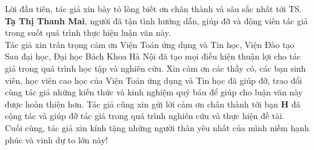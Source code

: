 \documentclass[
12pt, %
oneside, %
english, %
onehalfspacing, %
nolistspacing, %
headsepline, %
addchap,
]{MastersDoctoralThesis} %
\renewcommand{\baselinestretch}{1.5}
\begin{document}

\begin{acknowledgements}

Lời đầu tiên, tác giả xin bày tỏ lòng biết ơn chân thành và sâu sắc nhất tới TS. \textbf{Tạ Thị Thanh Mai}, người đã tận tình hướng dẫn, giúp đỡ và động viên tác giả trong suốt quá trình thực hiện luận văn này.\\[-0.5cm]

Tác giả xin trân trọng cảm ơn Viện Toán ứng dụng và Tin học, Viện Đào tạo Sau đại học, Đại học Bách Khoa Hà Nội đã tạo mọi điều kiện thuận lợi cho tác giả trong quá trình học tập và nghiên cứu. Xin cảm ơn các thầy cô, các bạn sinh viên, học viên cao học của Viện Toán ứng dụng và Tin học đã giúp đỡ, trao đổi cùng tác giả những kiến thức và kinh nghiệm quý báu để giúp cho luận văn này được hoàn thiện hơn. Tác giả cũng xin gửi lời cảm ơn chân thành tới bạn \textbf{H} đã cộng tác và giúp đỡ tác giả trong quá trình nghiên cứu và thực hiện đề tài.\\[-0.5cm]

Cuối cùng, tác giả xin kính tặng những người thân yêu nhất của mình niềm hạnh phúc và vinh dự to lớn này!
\end{acknowledgements}
\newpage
\renewcommand{\baselinestretch}{1.25}
\tableofcontents %
\renewcommand{\baselinestretch}{1.5}

\newpage
\listoffigures %

\newpage
\listoftables %

\newpage
\listofalgorithms %

%



\end{document}
